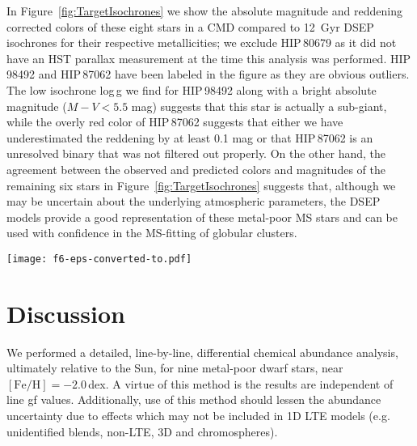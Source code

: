 \documentclass[revtex4]{emulateapj}
\begin{document}
In Figure~\ref{fig:TargetIsochrones} we show the absolute magnitude and reddening corrected colors of these eight stars in a CMD compared to 12~Gyr DSEP isochrones for their respective metallicities; we exclude HIP\,80679 as it did not have an HST parallax measurement at the time this analysis was performed.  HIP\,98492 and HIP\,87062 have been labeled in the figure as they are obvious outliers.  The low isochrone log\,g we find for HIP\,98492 along with a bright absolute magnitude ($M-V<5.5$ mag) suggests that this star is actually a sub-giant, while the overly red color of HIP\,87062 suggests that either we have underestimated the reddening by at least 0.1 mag or that HIP\,87062 is an unresolved binary that was not filtered out properly.  On the other hand, the agreement between the observed and predicted colors and magnitudes of the remaining six stars in Figure~\ref{fig:TargetIsochrones} suggests that, although we may be uncertain about the underlying atmospheric parameters, the DSEP models provide a good representation of these metal-poor MS stars and can be used with confidence in the MS-fitting of globular clusters.

\begin{figure*}[t]
\centering
\texttt{[image: f6-eps-converted-to.pdf]}
\caption{The CMD locations (in absolute magnitude and dereddened color) of eight of the target stars are compared to theoretical isochrones in the range of metallicities covered in this study.  There is good agreement for six of the eight stars.  The outliers, HIP\,87062 and HIP\,98492, are both effected by enhanced reddening.  HIP\,87062 may be an unresolved binary while HIP\,98492 is likely a sub-giant branch star. \label{fig:TargetIsochrones}}
\vspace{0.25cm}
\end{figure*}

\section{Discussion \label{sec:Discussion}}
We performed a detailed, line-by-line, differential chemical abundance analysis, ultimately relative to the Sun, for nine metal-poor dwarf stars, near $\mathrm{[Fe/H]}=-2.0$\,dex.  A virtue of this method is the results are independent of line gf values.  Additionally, use of this method should lessen the abundance uncertainty due to effects which may not be included in 1D LTE models (e.g. unidentified blends, non-LTE, 3D and chromospheres).
\end{document}

